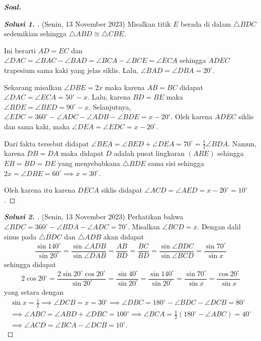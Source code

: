 \textbf{\textit{Soal. }}
\begin{proof}[\textbf{Solusi 1. }] (Senin, 13 November 2023) Misalkan titik $E$ berada di dalam $\triangle BDC$ sedemikian sehingga $\triangle ABD \cong \triangle CBE$. 
% 

Ini berarti $AD=EC$ dan $\angle DAC = \angle BAC - \angle BAD = \angle BCA - \angle BCE = \angle ECA$ sehingga $ADEC$ trapesium sama kaki yang jelas siklis. Lalu, $\angle BAD = \angle DBA = 20^\circ$. 

Sekarang misalkan $\angle DBE = 2x$ maka karena $AB=BC$ didapat $\angle DAC = \angle ECA = 50^\circ - x$. Lalu, karena $BD=BE$ maka $\angle BDE = \angle BED = 90^\circ-x$. Selanjutnya, $\angle EDC = 360^\circ - \angle ADC - \angle ADB - \angle BDE = x-20^\circ$. Oleh karena $ADEC$ siklis dan sama kaki, maka $\angle DEA = \angle EDC = x-20^\circ$.

Dari fakta tersebut didapat $\angle BEA = \angle BED + \angle DEA = 70^\circ = \frac{1}{2}\angle BDA$. Namun, karena $DB=DA$ maka didapat $D$ adalah pusat lingkaran $(ABE)$ sehingga $EB=BD=DE$ yang menyebabkana $\triangle BDE$ sama sisi sehingga $2x = \angle DBE = 60^\circ \implies x = 30^\circ$. 

Oleh karena itu karena $DECA$ siklis didapat $\angle ACD = \angle AED = x-20^\circ = 10^\circ$.
\end{proof}

\begin{proof}[\textbf{Solusi 2. }] (Senin, 13 November 2023) Perhatikan bahwa $\angle BDC = 360^\circ - \angle BDA - \angle ADC = 70^\circ$. Misalkan $\angle BCD = x$.
Dengan dalil sinus pada $\triangle BDC$ dan $\triangle ADB$ akan didapat
\begin{align*}
    \dfrac{\sin 140^\circ}{\sin 20^\circ} = \dfrac{\sin \angle ADB}{\sin \angle DAB} = \dfrac{AB}{BD} = \dfrac{BC}{BD} = \dfrac{\sin \angle BDC}{\sin \angle BCD} = \dfrac{\sin 70^\circ}{\sin x}
\end{align*}
sehingga didapat
\begin{align*}
    2\cos 20^\circ = \dfrac{2\sin 20^\circ \cos 20^\circ}{\sin 20^\circ} = \dfrac{\sin 40^\circ}{\sin 20^\circ} = \dfrac{\sin 140^\circ}{\sin 20^\circ} = \dfrac{\sin 70^\circ}{\sin x} = \dfrac{\cos 20^\circ}{\sin x}
\end{align*}
yang setara dengan
\begin{align*}
    \sin x = \frac{1}{2} \implies \angle DCB = x = 30^\circ \implies \angle DBC = 180^\circ - \angle BDC - \angle DCB = 80^\circ\\ \implies \angle ABC = \angle ABD + \angle DBC = 100^\circ \implies \angle BCA = \frac{1}{2}(180^\circ-\angle ABC) = 40^\circ\\ \implies \angle ACD = \angle BCA - \angle DCB = 10^\circ.
\end{align*}
% 


\end{proof}